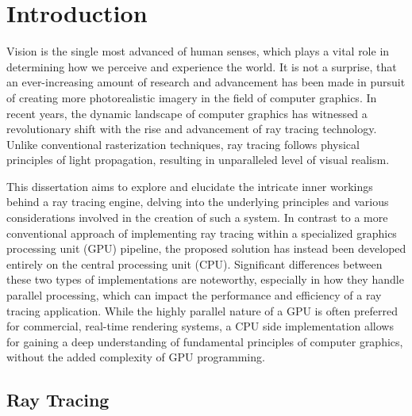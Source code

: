
\chapter{Introduction} \label{ch:Introduction}

Vision is the single most advanced of human senses, which plays a vital role in determining how we perceive and experience the world.
It is not a surprise, that an ever-increasing amount of research and advancement has been made in pursuit of creating more photorealistic imagery in the field of computer graphics. 
In recent years, the dynamic landscape of computer graphics has witnessed a revolutionary shift with the rise and advancement of ray tracing technology. 
Unlike conventional rasterization techniques, ray tracing follows physical principles of light propagation, resulting in unparalleled level of visual realism. 

This dissertation aims to explore and elucidate the intricate inner workings behind a ray tracing engine, delving into the underlying principles and various considerations involved in the creation of such a system.
In contrast to a more conventional approach of implementing ray tracing within a specialized graphics processing unit (GPU) pipeline, the proposed solution has instead been developed entirely on the central processing unit (CPU). 
Significant differences between these two types of implementations are noteworthy, especially in how they handle parallel processing, which can impact the performance and efficiency of a ray tracing application. 
While the highly parallel nature of a GPU is often preferred for commercial, real-time rendering systems, a CPU side implementation allows for gaining a deep understanding of fundamental principles of computer graphics, without the added complexity of GPU programming.

\section{Ray Tracing}


